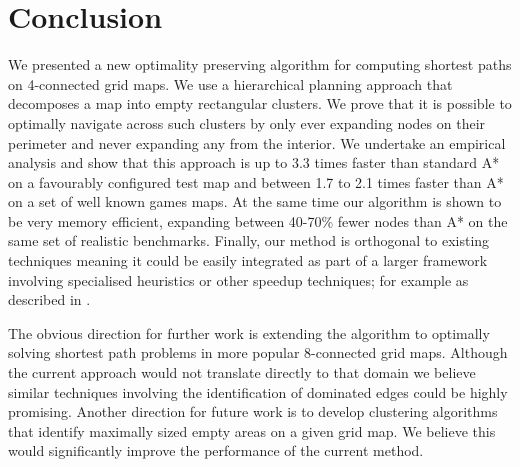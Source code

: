 \section{Conclusion}
We presented a new optimality preserving algorithm for computing shortest paths
on 4-connected grid maps.
We use a hierarchical planning approach that decomposes a map into empty rectangular clusters.
We prove that it is possible to optimally navigate across such clusters by only ever
expanding nodes on their perimeter and never expanding any from the interior.
We undertake an empirical analysis and show that this approach is up to 3.3 times faster than 
standard A* on a favourably configured test map and between 1.7 to 2.1 times faster than A* on 
a set of well known games maps. 
At the same time our algorithm is shown to be very memory efficient, 
expanding between 40-70\% fewer nodes than A* on the same set of realistic benchmarks.
Finally, our method is orthogonal to existing techniques meaning it could be easily integrated
as part of a larger framework involving specialised heuristics or other speedup techniques; 
for example as described in \cite{bjornsson05,bjornsson06}. 
\par
The obvious direction for further work is extending the algorithm to optimally solving 
shortest path problems in more popular 8-connected grid maps. 
Although the current approach would not translate directly to that domain we believe similar
techniques involving the identification of dominated edges could be highly promising.
Another direction for future work is to develop clustering algorithms that identify maximally
sized empty areas on a given grid map.
We believe this would significantly improve the performance of the current method.
